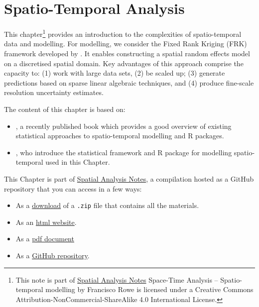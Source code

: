 \documentclass[
]{book}
\providecommand{\tightlist}{%
  \setlength{\itemsep}{0pt}\setlength{\parskip}{0pt}}
\begin{document}
\hypertarget{spatio-temporal-analysis}{%
\chapter{Spatio-Temporal Analysis}\label{spatio-temporal-analysis}}

This chapter\footnote{This note is part of \href{index.html}{Spatial Analysis Notes} {Space-Time Analysis -- Spatio-temporal modelling} by Francisco Rowe is licensed under a Creative Commons Attribution-NonCommercial-ShareAlike 4.0 International License.} provides an introduction to the complexities of spatio-temporal data and modelling. For modelling, we consider the Fixed Rank Kriging (FRK) framework developed by \citet{cressie2008fixed}. It enables constructing a spatial random effects model on a discretised spatial domain. Key advantages of this approach comprise the capacity to: (1) work with large data sets, (2) be scaled up; (3) generate predictions based on sparse linear algebraic techniques, and (4) produce fine-scale resolution uncertainty estimates.

The content of this chapter is based on:

\begin{itemize}
\item
  \citet{wikle2019spatio}, a recently published book which provides a good overview of existing statistical approaches to spatio-temporal modelling and R packages.
\item
  \citet{zammit2017frk}, who introduce the statistical framework and R package for modelling spatio-temporal used in this Chapter.
\end{itemize}

This Chapter is part of \href{index.html}{Spatial Analysis Notes}, a compilation hosted as a GitHub repository that you can access in a few ways:

\begin{itemize}
\tightlist
\item
  As a \href{https://github.com/GDSL-UL/san/archive/master.zip}{download} of a \texttt{.zip} file that contains all the materials.
\item
  As an \href{https://gdsl-ul.github.io/san/spatio-temporal-analysis.html}{html
  website}.
\item
  As a \href{https://gdsl-ul.github.io/san/spatial_analysis_notes.pdf}{pdf
  document}
\item
  As a \href{https://github.com/GDSL-UL/san}{GitHub repository}.
\end{itemize}
\end{document}
